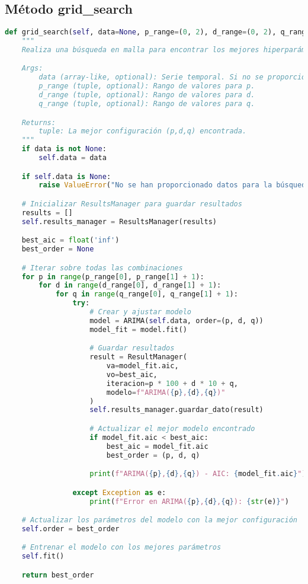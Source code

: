 \documentclass[12pt,letterpaper]{report}
\begin{document}
\subsection{Método grid\_search}
\begin{lstlisting}[language=python]
def grid_search(self, data=None, p_range=(0, 2), d_range=(0, 2), q_range=(0, 2)):
    """
    Realiza una búsqueda en malla para encontrar los mejores hiperparámetros (p,d,q).

    Args:
        data (array-like, optional): Serie temporal. Si no se proporciona, se usan los datos del constructor.
        p_range (tuple, optional): Rango de valores para p.
        d_range (tuple, optional): Rango de valores para d.
        q_range (tuple, optional): Rango de valores para q.

    Returns:
        tuple: La mejor configuración (p,d,q) encontrada.
    """
    if data is not None:
        self.data = data

    if self.data is None:
        raise ValueError("No se han proporcionado datos para la búsqueda en malla")

    # Inicializar ResultsManager para guardar resultados
    results = []
    self.results_manager = ResultsManager(results)

    best_aic = float('inf')
    best_order = None

    # Iterar sobre todas las combinaciones
    for p in range(p_range[0], p_range[1] + 1):
        for d in range(d_range[0], d_range[1] + 1):
            for q in range(q_range[0], q_range[1] + 1):
                try:
                    # Crear y ajustar modelo
                    model = ARIMA(self.data, order=(p, d, q))
                    model_fit = model.fit()

                    # Guardar resultados
                    result = ResultManager(
                        va=model_fit.aic,
                        vo=best_aic,
                        iteracion=p * 100 + d * 10 + q,
                        modelo=f"ARIMA({p},{d},{q})"
                    )
                    self.results_manager.guardar_dato(result)

                    # Actualizar el mejor modelo encontrado
                    if model_fit.aic < best_aic:
                        best_aic = model_fit.aic
                        best_order = (p, d, q)

                    print(f"ARIMA({p},{d},{q}) - AIC: {model_fit.aic}")

                except Exception as e:
                    print(f"Error en ARIMA({p},{d},{q}): {str(e)}")

    # Actualizar los parámetros del modelo con la mejor configuración
    self.order = best_order

    # Entrenar el modelo con los mejores parámetros
    self.fit()

    return best_order
\end{lstlisting}
\end{document}
